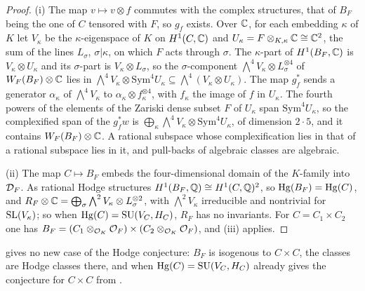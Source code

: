 \begin{proof}
(i) The map $v\mapsto v\otimes f$ commutes with the complex structures, that of
$B_{F}$ being the one of $C$ tensored with $F$, so $g_{f}$ exists. Over $\mathbb{C}$,
for each embedding $\kappa$ of $K$ let $V_{\kappa}$ be the $\kappa$-eigenspace
of $K$ on $H^{1}(C,\mathbb{C})$ and $U_{\kappa}=F\otimes_{K,\kappa}\mathbb{C}\cong\mathbb{C}^{2}$, the
sum of the lines $L_{\sigma}$, $\sigma|\kappa$, on which $F$ acts through
$\sigma$. The $\kappa$-part of $H^{1}(B_{F},\mathbb{C})$ is $V_{\kappa}\otimes
U_{\kappa}$ and its $\sigma$-part is $V_{\kappa}\otimes L_{\sigma}$, so the
$\sigma$-component $\bigwedge^{4}V_{\kappa}\otimes L_{\sigma}^{\otimes4}$ of
$W_{F}(B_{F})\otimes\mathbb{C}$ lies in $\bigwedge^{4}V_{\kappa}\otimes
\mathrm{Sym}^{4}U_{\kappa}\subseteq\bigwedge^{4}(V_{\kappa}\otimes U_{\kappa})$.
The map $g_{f}^{*}$ sends a generator $\alpha_{\kappa}$ of $\bigwedge^{4}V_{\kappa}$
to $\alpha_{\kappa}\otimes f_{\kappa}^{\otimes4}$, with $f_{\kappa}$ the image
of $f$ in $U_{\kappa}$. The fourth powers of the elements of the Zariski
dense subset $F$ of $U_{\kappa}$ span $\mathrm{Sym}^{4}U_{\kappa}$, so the
complexified span of the $g_{f}^{*}w$ is $\bigoplus_{\kappa}\bigwedge^{4}V_{\kappa}
\otimes\mathrm{Sym}^{4}U_{\kappa}$, of dimension $2\cdot5$, and it contains
$W_{F}(B_{F})\otimes\mathbb{C}$. A rational subspace whose complexification lies in
that of a rational subspace lies in it, and pull-backs of algebraic classes
are algebraic.

(ii) The map $C\mapsto B_{F}$ embeds the four-dimensional domain of the
$K$-family into $\mathcal{D}_{F}$. As rational Hodge structures
$H^{1}(B_{F},\mathbb{Q})\cong H^{1}(C,\mathbb{Q})^{2}$, so $\operatorname{Hg}(B_{F})=\operatorname{Hg}(C)$, and
$R_{F}\otimes\mathbb{C}=\bigoplus_{\sigma}\bigwedge^{2}V_{\kappa}\otimes
L_{\sigma}^{\otimes2}$, with $\bigwedge^{2}V_{\kappa}$ irreducible and
nontrivial for $\operatorname{SL}(V_{\kappa})$; so when $\operatorname{Hg}(C)=\operatorname{SU}(V_{C},H_{C})$, $R_{F}$
has no invariants. For $C=C_{1}\times C_{2}$ one has
$B_{F}=(C_{1}\otimes_{\mathcal{O}_{K}}\mathcal{O}_{F})\times(C_{2}\otimes_{\mathcal{O}_{K}}\mathcal{O}_{F})$, and
(iii) applies.
\end{proof}

 gives no new case of the Hodge conjecture: $B_{F}$ is
isogenous to $C\times C$, the classes are Hodge classes there, and when
$\operatorname{Hg}(C)=\operatorname{SU}(V_{C},H_{C})$  already gives the conjecture for
$C\times C$ from \cite{Mar25a}.

